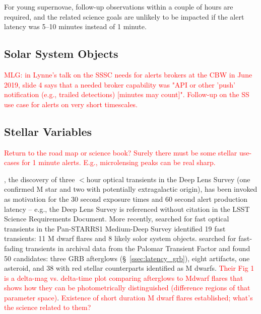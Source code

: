 \documentclass[DM,lsstdraft,authoryear,toc]{lsstdoc}
\begin{document}
For young supernovae, follow-up observations within a couple of hours are required, and the related science goals are unlikely to be impacted if the alert latency was 5--10 minutes instead of 1 minute.

\subsection{Solar System Objects}\label{ssec:latency_sso}

\textcolor{red}{MLG: in Lynne's talk on the SSSC needs for alerts brokers at the CBW in June 2019, slide 4 says that a needed broker capability was "API or other 'push' notification (e.g., trailed detections) [minutes may count]". Follow-up on the SS use case for alerts on very short timescales.}

\subsection{Stellar Variables}\label{ssec:latency_stars}

\textcolor{red}{Return to the road map or science book? Surely there must be some stellar use-cases for 1 minute alerts. E.g., microlensing peaks can be real sharp.}

\citet{2006ApJ...644L..63K}, the discovery of three $<$hour optical transients in the Deep Lens Survey (one confirmed M star and two with potentially extragalactic origin), has been invoked as motivation for the 30 second exposure times and 60 second alert production latency -- e.g., the Deep Lens Survey is referenced without citation in the LSST Science Requirements Document. More recently, \citet{2013ApJ...779...18B} searched for fast optical transients in the Pan-STARRS1 Medium-Deep Survey identified 19 fast transients: 11 M dwarf flares and 8 likely solor system objects. \citet{2018ApJ...854L..13H} searched for fast-fading transients in archival data from the Palomar Transient Factor and found 50 candidates: three GRB afterglows (\S~\ref{ssec:latency_grb}), eight artifacts, one asteroid, and 38 with red stellar counterparts identified as M dwarfs. \textcolor{red}{Their Fig 1 is a delta-mag vs. delta-time plot comparing afterglows to Mdwarf flares that shows how they can be photometrically distinguished (difference regions of that parameter space)}. \textcolor{red}{Existence of short duration M dwarf flares established; what's the science related to them?}



\end{document}
